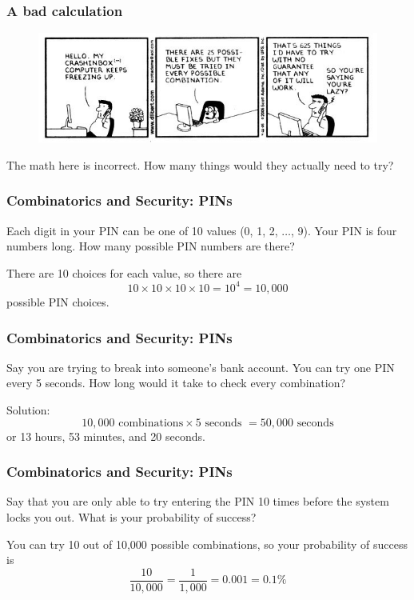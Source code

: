 \documentclass{beamer}
\newcommand{\<}{\langle}
\renewcommand{\>}{\rangle}
\begin{document}
\begin{frame}
\frametitle{A bad calculation}

\begin{figure}
\includegraphics[scale=.5]{IMG/comic.jpg}
\end{figure}

The math here is incorrect. How many things would they actually need to try?
\end{frame}


\begin{frame}
\frametitle{Combinatorics and Security: PINs}

Each digit in your PIN can be one of 10 values (0, 1, 2, $\dots$, 9). Your PIN is four numbers long. How many possible PIN numbers are there?\newline

\pause

There are 10 choices for each value, so there are
\[
10 \times 10 \times 10 \times 10 = 10^4 = 10,000
\]
possible PIN choices.
\end{frame}

\begin{frame}
\frametitle{Combinatorics and Security: PINs}

Say you are trying to break into someone's bank account. You can try one PIN every 5 seconds. How long would it take to check every combination? \newline

\pause

Solution:
\[
10,000 \text{ combinations} \times 5 \text{ seconds } = 50,000 \text{ seconds}
\]
or 13 hours, 53 minutes, and 20 seconds. 
\end{frame}

\begin{frame}
\frametitle{Combinatorics and Security: PINs}

Say that you are only able to try entering the PIN 10 times before the system locks you out. What is your probability of success?\newline\pause

You can try 10 out of 10,000 possible combinations, so your probability of success is 
\[
\frac{10}{10,000} = \frac{1}{1,000} = 0.001 = 0.1\%
\]
\end{frame}
\end{document}
